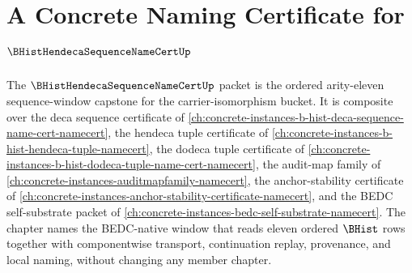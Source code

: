 \chapter{A Concrete Naming Certificate for $\BHistHendecaSequenceNameCertUp$}
\label{ch:concrete-instances-b-hist-hendeca-sequence-name-cert-namecert}

The $\BHistHendecaSequenceNameCertUp$ packet is the ordered arity-eleven sequence-window capstone for the carrier-isomorphism bucket. It is composite over the deca sequence certificate of \autoref{ch:concrete-instances-b-hist-deca-sequence-name-cert-namecert}, the hendeca tuple certificate of \autoref{ch:concrete-instances-b-hist-hendeca-tuple-namecert}, the dodeca tuple certificate of \autoref{ch:concrete-instances-b-hist-dodeca-tuple-name-cert-namecert}, the audit-map family of \autoref{ch:concrete-instances-auditmapfamily-namecert}, the anchor-stability certificate of \autoref{ch:concrete-instances-anchor-stability-certificate-namecert}, and the BEDC self-substrate packet of \autoref{ch:concrete-instances-bedc-self-substrate-namecert}. The chapter names the BEDC-native window that reads eleven ordered $\BHist$ rows together with componentwise transport, continuation replay, provenance, and local naming, without changing any member chapter.

